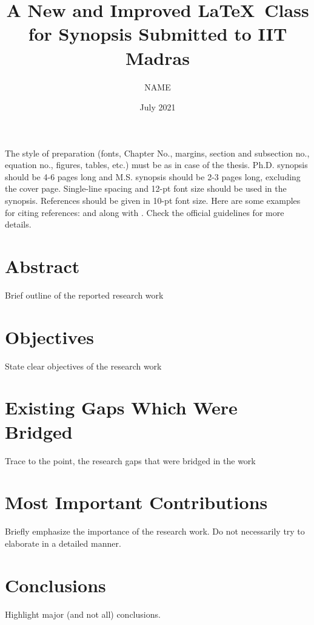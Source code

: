 \documentclass[MS,synopsis]{iitmdiss}
\title{A New and Improved \LaTeX\ Class for Synopsis Submitted to IIT Madras}
\author{NAME}
\date{July 2021}
\begin{document}
\maketitle
\restoregeometry

\setcounter{page}{0}

\singlespacing

The style of preparation (fonts, Chapter No., margins, section and subsection no.,
equation no., figures, tables, etc.) must be as in case of the thesis. Ph.D. synopsis should be 4-6 pages long and M.S. synopsis should be 2-3 pages
long, excluding the cover page. Single-line spacing and 12-pt font size should be used in the synopsis. References should be given in 10-pt font size. Here are some examples for citing references: \cite{lamport:86} and \cite{Ahren2005} along with \cite{Roenby2016}. Check the official guidelines for more details.

\section{Abstract}
Brief outline of the reported research work

\section{Objectives}
State clear objectives of the research work

\section{Existing Gaps Which Were Bridged}
Trace to the point, the research gaps that were bridged in the work

\section{Most Important Contributions}
Briefly emphasize the importance of the research work. Do not necessarily try to elaborate in a detailed manner.

\section{Conclusions}
Highlight major (and not all) conclusions.
\end{document}

